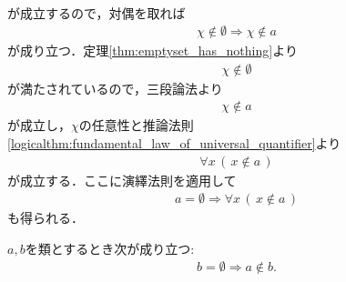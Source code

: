 \begin{prf}
\begin{align}
		\end{align}
		が成立するので，対偶を取れば
		\begin{align}
			\chi \notin \emptyset \Longrightarrow \chi \notin a
		\end{align}
		が成り立つ．定理\ref{thm:emptyset_has_nothing}より
		\begin{align}
			\chi \notin \emptyset
		\end{align}
		が満たされているので，三段論法より
		\begin{align}
			\chi \notin a
		\end{align}
		が成立し，$\chi$の任意性と推論法則\ref{logicalthm:fundamental_law_of_universal_quantifier}より
		\begin{align}
			\forall x\, (\, x \notin a\, )
		\end{align}
		が成立する．ここに演繹法則を適用して
		\begin{align}
			a = \emptyset \Longrightarrow \forall x\, (\, x \notin a\, )
		\end{align}
		も得られる．
		\QED
	\end{prf}
	
	\begin{screen}
		\begin{thm}[空集合はいかなる類も要素に持たない]
		\label{thm:emptyset_does_not_contain_any_class}
			$a,b$を類とするとき次が成り立つ:
			\begin{align}
				b = \emptyset \Longrightarrow a \notin b.
			\end{align}
		\end{thm}
	\end{screen}
	
